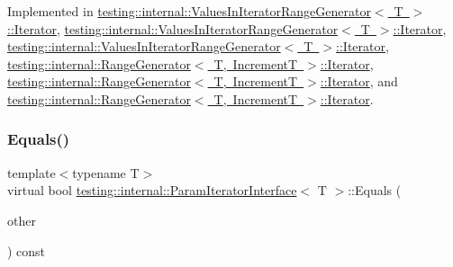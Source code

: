Implemented in \mbox{\hyperlink{classtesting_1_1internal_1_1_values_in_iterator_range_generator_1_1_iterator_a75604bc318aca22ff8607b68bfb44e96}{testing\+::internal\+::\+Values\+In\+Iterator\+Range\+Generator$<$ T $>$\+::\+Iterator}}, \mbox{\hyperlink{classtesting_1_1internal_1_1_values_in_iterator_range_generator_1_1_iterator_a75604bc318aca22ff8607b68bfb44e96}{testing\+::internal\+::\+Values\+In\+Iterator\+Range\+Generator$<$ T $>$\+::\+Iterator}}, \mbox{\hyperlink{classtesting_1_1internal_1_1_values_in_iterator_range_generator_1_1_iterator_aff9f8c1c01a4e708235d8793b2c44d31}{testing\+::internal\+::\+Values\+In\+Iterator\+Range\+Generator$<$ T $>$\+::\+Iterator}}, \mbox{\hyperlink{classtesting_1_1internal_1_1_range_generator_1_1_iterator_a534406abbddb137d7672c2b53d5bff0b}{testing\+::internal\+::\+Range\+Generator$<$ T, Increment\+T $>$\+::\+Iterator}}, \mbox{\hyperlink{classtesting_1_1internal_1_1_range_generator_1_1_iterator_a534406abbddb137d7672c2b53d5bff0b}{testing\+::internal\+::\+Range\+Generator$<$ T, Increment\+T $>$\+::\+Iterator}}, and \mbox{\hyperlink{classtesting_1_1internal_1_1_range_generator_1_1_iterator_a2ae0f453be98bdcfffecc3c71c7a9879}{testing\+::internal\+::\+Range\+Generator$<$ T, Increment\+T $>$\+::\+Iterator}}.

\mbox{\label{classtesting_1_1internal_1_1_param_iterator_interface_a9d811697a752d46f7bd6a0082f9040a3}} 
\subsubsection{\texorpdfstring{Equals()}{Equals()}\hspace{0.1cm}{\footnotesize\ttfamily [2/3]}}
{\footnotesize\ttfamily template$<$typename T$>$ \\
virtual bool \mbox{\hyperlink{classtesting_1_1internal_1_1_param_iterator_interface}{testing\+::internal\+::\+Param\+Iterator\+Interface}}$<$ T $>$\+::Equals (\begin{DoxyParamCaption}\item[{const \mbox{\hyperlink{classtesting_1_1internal_1_1_param_iterator_interface}{Param\+Iterator\+Interface}}$<$ T $>$ \&}]{other }\end{DoxyParamCaption}) const\hspace{0.3cm}{\ttfamily [pure virtual]}}



